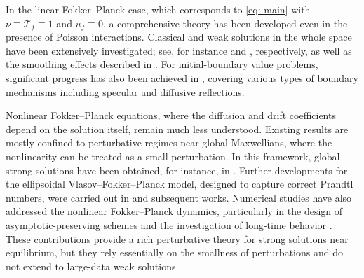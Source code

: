 \documentclass[10pt, reqno]{amsart}
\theoremstyle{plain}
\theoremstyle{definition}
\theoremstyle{remark}
\numberwithin{equation}{section}
\newcommand{\calT}{\mathcal T}
\begin{document}
In the linear Fokker--Planck case, which corresponds to \eqref{eq: main} with $\nu \equiv \calT_f \equiv 1$ and $u_f \equiv 0$, a comprehensive theory has been developed even in the presence of Poisson interactions. Classical and weak solutions in the whole space have been extensively investigated; see, for instance \cite{Bou93, Deg86, HJ13, RW92, VO90} and \cite{CS95, CS97, Cas98, Vic91}, respectively, as well as the smoothing effects described in \cite{Bou95}. For initial-boundary value problems, significant progress has also been achieved in \cite{BCS97, Carrillo98, HK19, MH22, Mischler2010}, covering various types of boundary mechanisms including specular and diffusive reflections. 

Nonlinear Fokker--Planck equations, where the diffusion and drift coefficients depend on the solution itself, remain much less understood. Existing results are mostly confined to perturbative regimes near global Maxwellians, where the nonlinearity can be treated as a small perturbation. In this framework, global strong solutions have been obtained, for instance, in \cite{Bed17, LY21}. Further developments for the ellipsoidal Vlasov--Fokker--Planck model, designed to capture correct Prandtl numbers, were carried out in \cite{MM17, SJ19} and subsequent works. Numerical studies have also addressed the nonlinear Fokker--Planck dynamics, particularly in the design of asymptotic-preserving schemes and the investigation of long-time behavior \cite{AC23, FN22}. These contributions provide a rich perturbative theory for strong solutions near equilibrium, but they rely essentially on the smallness of perturbations and do not extend to large-data weak solutions.
\end{document}
